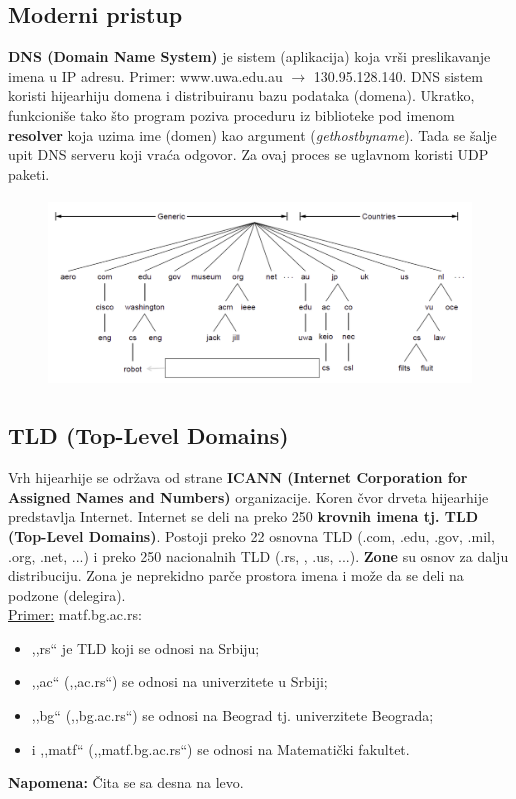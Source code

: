 \documentclass[a4paper]{article}
\begin{document}
    \subsection{Moderni pristup}
        \textbf{DNS (Domain Name System)} je sistem (aplikacija) koja vrši preslikavanje imena
        u IP adresu. Primer: www.uwa.edu.au $\rightarrow$ 130.95.128.140. DNS sistem koristi
        hijearhiju domena i distribuiranu bazu podataka (domena). Ukratko, funkcioniše 
        tako što program poziva proceduru iz biblioteke pod imenom \textbf{resolver} koja uzima ime 
        (domen) kao argument (\textit{gethostbyname}). Tada se šalje upit DNS serveru koji vraća odgovor.
        Za ovaj proces se uglavnom koristi UDP paketi.
        \begin{figure}[H]
            \begin{center}
                \includegraphics[width=120mm,height=50mm]{Slike/dns1.png}
            \end{center}
        \end{figure}
    \subsection{TLD (Top-Level Domains)}
        \indent Vrh hijearhije se održava od strane \textbf{ICANN (Internet Corporation for Assigned 
        Names and Numbers)} organizacije. Koren čvor drveta hijearhije predstavlja Internet. Internet
        se deli na preko 250 \textbf{krovnih imena tj. TLD (Top-Level Domains)}. Postoji preko 
        22 osnovna TLD (.com, .edu, .gov, .mil, .org, .net, ...) i preko 250 nacionalnih TLD (.rs,
        , .us, ...). \textbf{Zone} su osnov za dalju distribuciju. Zona je neprekidno parče 
        prostora imena i može da se deli na podzone (delegira). \\
        \noindent \underline{Primer:} matf.bg.ac.rs: 
        \begin{itemize}
            \item ,,rs`` je TLD koji se odnosi na Srbiju;
            \item ,,ac`` (,,ac.rs``) se odnosi na univerzitete u Srbiji;
            \item ,,bg`` (,,bg.ac.rs``) se odnosi na Beograd tj. univerzitete Beograda;
            \item i ,,matf`` (,,matf.bg.ac.rs``) se odnosi na Matematički fakultet. 
        \end{itemize}  
        \textbf{Napomena:} Čita se sa desna na levo. 
\end{document}
